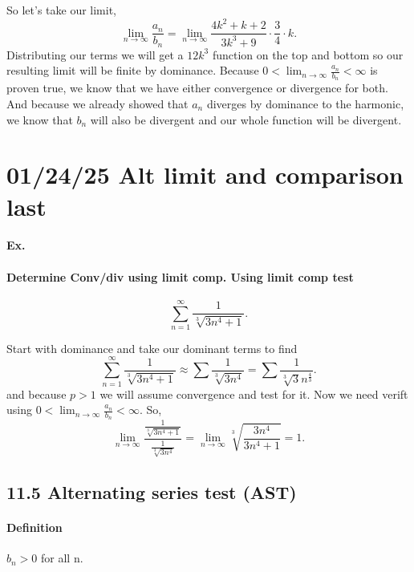 So let's take our limit,
\[
\lim_{ n \to \infty} \frac{ a_n }{ b_n }=\lim_{ n \to \infty} \frac{ 4k^2+k+2 }{ 3k^3+9 }\cdot \frac{ 3 }{ 4 } \cdot k
.\] 
Distributing our terms we will get a $ 12k^3 $ function on the top and bottom so our resulting limit will be finite by dominance. Because $ 0<\lim_{ n \to \infty} \frac{ a_n }{ b_n }<\infty $ is proven true, we know that we have either convergence or divergence for both. And because we already showed that $ a_n $ diverges by dominance to the harmonic, we know that $ b_n $ will also be divergent and our whole function will be divergent. 
\section{01/24/25 Alt limit and comparison last}%
\label{sec:01/24/25 Alt limit and comparison last}

\paragraph{Ex.}
\paragraph{Determine Conv/div using limit comp. Using limit comp test}
\[
\sum_{ n=1 } ^{ \infty } \frac{ 1 }{ \sqrt[ 3 ]{ 3n^{ 4 }+ 1}  } 
.\] 

Start with dominance and take our dominant terms to find
\[
\sum_{ n=1 } ^{ \infty } \frac{ 1 }{ \sqrt[ 3 ]{ 3n^{ 4 }+1 }  } \approx \sum_{  } ^{  } \frac{ 1 }{ \sqrt[ 3 ]{ 3n^{ 4 } }  } =\sum_{  } ^{  } \frac{ 1 }{ \sqrt[ 3 ]{ 3 } n^{ \frac{ 4 }{ 3 }  } } 
.\] 
and because $ p > 1 $ we will assume convergence and test for it. Now we need verift using $ 0<\lim_{ n \to \infty} \frac{ a_n }{ b_n } <\infty $. So, 
\[
\lim_{ n \to \infty} \frac{ \frac{ 1 }{ \sqrt[ 3 ]{ 3n^{ 4 }+1 }  }  } {\frac{ 1 }{ \sqrt[ 3 ]{ 3n^{ 4 } }  }}  = \lim_{ n \to \infty} \sqrt[ 3 ]{ \frac{ 3n^{ 4 } }{ 3n^{ 4 }+1 } }= 1
.\] 

\subsection*{11.5 Alternating series test (AST)}%
\label{sub:11.5 Alternating series test (AST)}

\paragraph{Definition\\}
$ b_n > 0 $ for all n.

